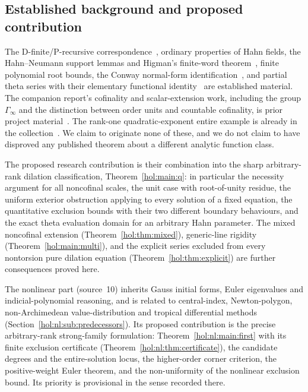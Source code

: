 \documentclass[11pt]{article}
\numberwithin{equation}{section}
\theoremstyle{definition}
\theoremstyle{remark}
\begin{document}
\subsection{Established background and proposed contribution}

The D-finite/P-recursive correspondence~\cite{stanley}, ordinary properties of
Hahn fields, the Hahn--Neumann support lemmas and Higman's finite-word
theorem~\cite{higman}, finite polynomial root bounds, the Conway normal-form
identification~\cite{bg,kks}, and partial theta series with their elementary
functional identity~\cite{andrewswarnaar} are established material. The
companion report's cofinality and scalar-extension work, including the group
$\Gamma_\infty$ and the distinction between order units and countable
cofinality, is prior project material~\cite{repoentire}. The rank-one
quadratic-exponent entire example is already in the
collection~\cite{reporankone}. We claim to originate none of these, and we do
not claim to have disproved any published theorem about a different analytic
function class.

The proposed research contribution is their combination into the sharp
arbitrary-rank dilation classification, Theorem~\ref{hol:main:q}: in
particular the necessity argument for all noncofinal scales, the unit case
with root-of-unity residue, the uniform exterior obstruction applying to every
solution of a fixed equation, the quantitative exclusion bounds with their two
different boundary behaviours, and the exact theta evaluation domain for an
arbitrary Hahn parameter. The mixed noncofinal extension
(Theorem~\ref{hol:thm:mixed}), generic-line rigidity
(Theorem~\ref{hol:main:multi}), and the explicit series excluded from every
nontorsion pure dilation equation (Theorem~\ref{hol:thm:explicit}) are further
consequences proved here.

The nonlinear part (source~10) inherits Gauss initial forms, Euler
eigenvalues and indicial-polynomial reasoning, and is related to
central-index, Newton-polygon, non-Archimedean value-distribution and tropical
differential methods (Section~\ref{hol:nl:sub:predecessors}). Its proposed
contribution is the precise arbitrary-rank strong-family formulation:
Theorem~\ref{hol:nl:main:first} with its finite exclusion certificate
(Theorem~\ref{hol:nl:thm:certificate}), the candidate degrees and the
entire-solution locus, the higher-order corner criterion, the positive-weight
Euler theorem, and the non-uniformity of the nonlinear exclusion bound. Its
priority is provisional in the sense recorded there.
\end{document}
